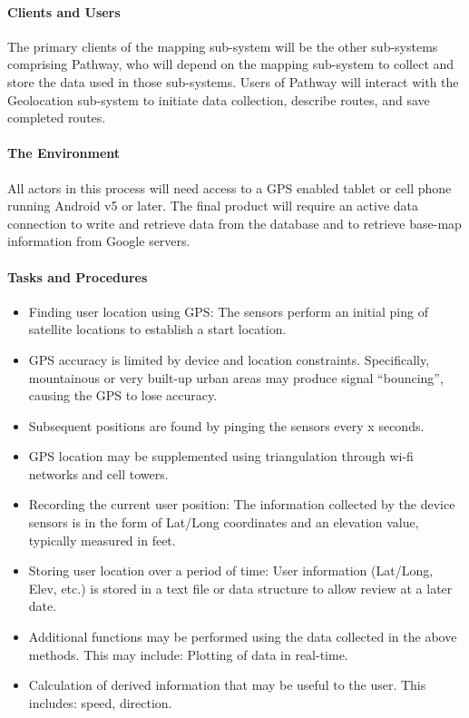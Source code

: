 \documentclass{article}
\begin{document}
\paragraph{Clients and Users}
The primary clients of the mapping sub-system will be the other sub-systems comprising Pathway, who will depend on the mapping sub-system to collect and store the data used in those sub-systems. Users of Pathway will interact with the Geolocation sub-system to initiate data collection, describe routes, and save completed routes.

\paragraph{The Environment}
All actors in this process will need access to a GPS enabled tablet or cell phone running Android v5 or later.  The final product will require an active data connection to write and retrieve data from the database and to retrieve base-map information from Google servers.

\paragraph{Tasks and Procedures}
\begin{itemize}
\item Finding user location using GPS: The sensors perform an initial ping of satellite locations to establish a start location.
\item GPS accuracy is limited by device and location constraints. Specifically, mountainous or very built-up urban areas may produce signal “bouncing”, causing the GPS to lose accuracy.
\item Subsequent positions are found by pinging the sensors every x seconds.
\item GPS location may be supplemented using triangulation through wi-fi networks and cell towers.
\item Recording the current user position: The information collected by the device sensors is in the form of Lat/Long coordinates and an elevation value, typically measured in feet.
\item Storing user location over a period of time: User information (Lat/Long, Elev, etc.) is stored in a text file or data structure to allow review at a later date.
\item Additional functions may be performed using the data collected in the above methods. This may include: Plotting of data in real-time.
\item Calculation of derived information that may be useful to the user. This includes: speed, direction.
\end{itemize}
\end{document}
